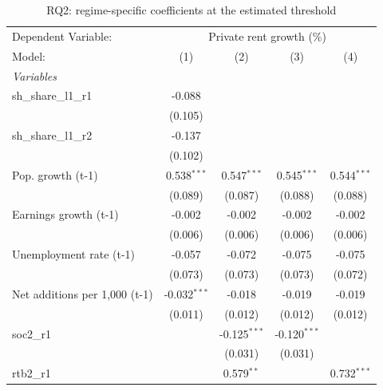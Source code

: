 
\begin{table}[htbp]
   \caption{RQ2: regime-specific coefficients at the estimated threshold}
   \centering
   \begin{tabular}{lcccc}
      \tabularnewline \midrule \midrule
      Dependent Variable: & \multicolumn{4}{c}{Private rent growth (\%)}\\
      Model:                        & (1)            & (2)            & (3)            & (4)\\  
      \midrule
      \emph{Variables}\\
      sh\_share\_l1\_r1             & -0.088         &                &                &   \\   
                                    & (0.105)        &                &                &   \\   
      sh\_share\_l1\_r2             & -0.137         &                &                &   \\   
                                    & (0.102)        &                &                &   \\   
      Pop. growth (t-1)             & 0.538$^{***}$  & 0.547$^{***}$  & 0.545$^{***}$  & 0.544$^{***}$\\   
                                    & (0.089)        & (0.087)        & (0.088)        & (0.088)\\   
      Earnings growth (t-1)         & -0.002         & -0.002         & -0.002         & -0.002\\   
                                    & (0.006)        & (0.006)        & (0.006)        & (0.006)\\   
      Unemployment rate (t-1)       & -0.057         & -0.072         & -0.075         & -0.075\\   
                                    & (0.073)        & (0.073)        & (0.073)        & (0.072)\\   
      Net additions per 1,000 (t-1) & -0.032$^{***}$ & -0.018         & -0.019         & -0.019\\   
                                    & (0.011)        & (0.012)        & (0.012)        & (0.012)\\   
      soc2\_r1                      &                & -0.125$^{***}$ & -0.120$^{***}$ &   \\   
                                    &                & (0.031)        & (0.031)        &   \\   
      rtb2\_r1                      &                & 0.579$^{**}$   &                & 0.732$^{***}$\\   

\end{tabular}
\end{table}
